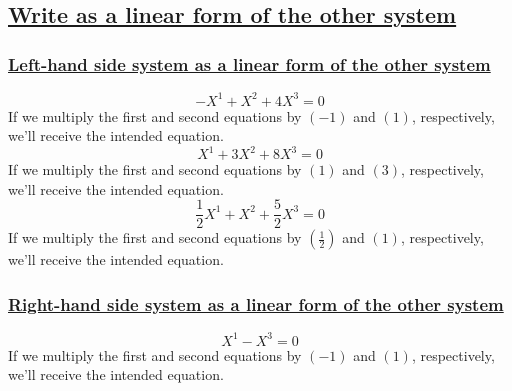 \documentclass[a4paper, 12pt]{article}
\newcommand{\sub}[1]{\subsection{\underline{#1}}}
\newcommand{\subsub}[1]{\subsubsection{\underline{#1}}}
\newcommand{\?}{\stackrel{?}{=}}
\begin{document}
\sub{Write as a linear form of the other system}
\subsub{Left-hand side system as a linear form of the other system}
$$ -X^1 + X^2 + 4X^3 = 0 $$
If we multiply the first and second equations by $(-1)$ and $(1)$, respectively, we'll receive the intended equation.
$$ X^1 + 3X^2 + 8X^3 = 0 $$
If we multiply the first and second equations by $(1)$ and $(3)$, respectively, we'll receive the intended equation.
$$ \frac{1}{2}X^1 + X^2 + \frac{5}{2}X^3 = 0 $$
If we multiply the first and second equations by $(\frac{1}{2})$ and $(1)$, respectively, we'll receive the intended equation.

\subsub{Right-hand side system as a linear form of the other system}
$$ X^1 - X^3 = 0 $$
If we multiply the first and second equations by $(-1)$ and $(1)$, respectively, we'll receive the intended equation.




\end{document}

